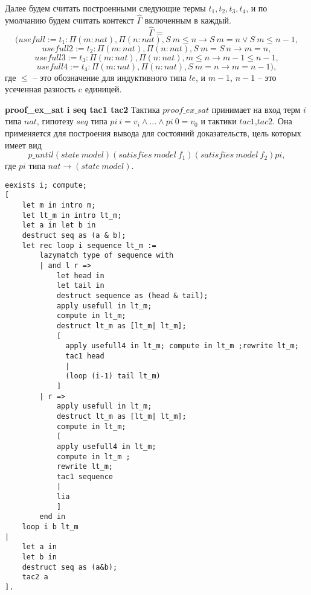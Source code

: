 \documentclass[12pt]{article}
\begin{document}
Далее будем считать построенными следующие термы $t_1, t_2, t_3, t_4$, и по умолчанию будем считать контекст $\hat{\Gamma}$ включенным в каждый.
$$\hat{\Gamma} = $$
$$(usefull:=t_1:\Pi (m:nat), \Pi (n:nat), S\ m \leq n \xrightarrow{} S\ m = n \vee S\ m \leq n - 1,$$
$$usefull2:=t_2:\Pi (m:nat), \Pi (n:nat),  S\ m = S\ n \xrightarrow{} m = n,$$
$$usefull3:=t_3:\Pi (m:nat), \Pi (n:nat),  m \leq n \xrightarrow{} m - 1 \leq n - 1,$$
$$usefull4:=t_4:\Pi (m:nat), \Pi (n:nat),  S\ m = n \xrightarrow{} m = n - 1),$$
где $\leq$ -- это обозначение для индуктивного типа $le$, и $m-1$, $n-1$ -- это усеченная разность c единицей. 

\textbf{proof\_ex\_sat i seq tac1 tac2} 
Тактика $proof\_ex\_sat$ принимает на вход терм $i$ типа $nat$, гипотезу $seq$ типа $pi\ i = v_i \wedge ... \wedge pi\ 0 = v_0$ и тактики $tac1$,$tac2$.
Она применяется для построения вывода для состояний доказательств, цель которых имеет вид
$$p\_until (state\ model) (satisfies\ model\ f_1) (satisfies\ model\ f_2) pi,$$ где $pi$ типа $nat \xrightarrow{} (state\ model)$.

\begin{verbatim}
eexists i; compute; 
[
    let m in intro m; 
    let lt_m in intro lt_m;
    let a in let b in
    destruct seq as (a & b);
    let rec loop i sequence lt_m := 
        lazymatch type of sequence with 
        | and l r =>
            let head in
            let tail in
            destruct sequence as (head & tail);
            apply usefull in lt_m;
            compute in lt_m; 
            destruct lt_m as [lt_m| lt_m]; 
            [
              apply usefull4 in lt_m; compute in lt_m ;rewrite lt_m;
              tac1 head
              |
              (loop (i-1) tail lt_m)
            ] 
        | r => 
            apply usefull in lt_m;
            destruct lt_m as [lt_m| lt_m]; 
            compute in lt_m; 
            [
            apply usefull4 in lt_m; 
            compute in lt_m ;
            rewrite lt_m;
            tac1 sequence
            |
            lia
            ]
        end in
    loop i b lt_m
| 
    let a in
    let b in
    destruct seq as (a&b);
    tac2 a
].
\end{verbatim}
\end{document}
